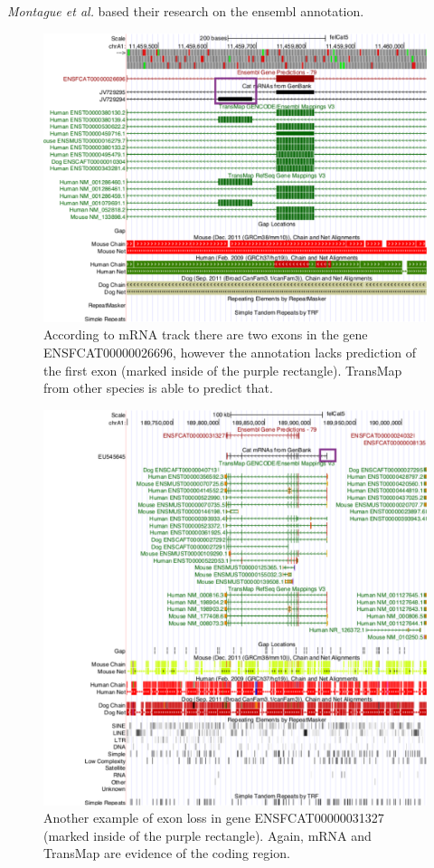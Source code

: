 \documentclass{article}
\begin{document}
\textit{Montague et al.} based their research on the ensembl annotation.


\begin{figure}[h]
\centering
\includegraphics[width=\textwidth]{images/hgt_hgwdev_e926_52a620_edit.pdf}
\caption{According to mRNA track there are two exons in the gene ENSFCAT00000026696, however the annotation lacks prediction of the first exon (marked inside of the purple rectangle). TransMap from other species is able to predict that.}
\label{fig:missed_exons_mrna_1}
\end{figure}

\begin{figure}[h]
\centering
\includegraphics[width=\textwidth]{images/hgt_hgwdev_ed86_52bfa0_edit.pdf}
\caption{Another example of exon loss in gene ENSFCAT00000031327 (marked inside of the purple rectangle). Again, mRNA and TransMap are evidence of the coding region.}
\label{fig:missed_exons_mrna_2}
\end{figure}
\end{document}

